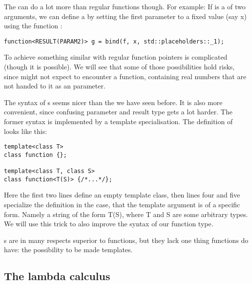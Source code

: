 The  can do a lot more than regular functions though. For example: If  is a  of two arguments, we can define a   by setting the first parameter to a fixed value (say \code x) using the function :
\begin{lstlisting}
function<RESULT(PARAM2)> g = bind(f, x, std::placeholders::_1);
\end{lstlisting}
To achieve something similar with regular function pointers is complicated (though it is possible). We will see that some of those possibilities hold risks, since \irram might not expect to encounter a function, containing real numbers that are not handed to it as an parameter.

The syntax  of s seems nicer than the  we have seen before. It is also more convenient, since confusing parameter and result type gets a lot harder. The former syntax is implemented by a template specialisation. The definition of looks like this:
\begin{lstlisting}
template<class T>
class function {};

template<class T, class S>
class function<T(S)> {/*...*/};
\end{lstlisting}
Here the first two lines define an empty template class, then lines four and five specialize the definition in the case, that the template argument is of a specific form. Namely a string of the form T(S), where T and S are some arbitrary types. We will use this trick to also improve the syntax of our function type.

s are in many respects superior to \cc functions, but they lack one thing functions do have: the possibility to be made templates.


\subsection{The \cc lambda calculus}\label{sec: The C++ lambda calculus}

